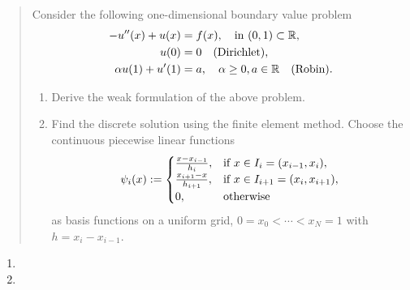 \documentclass[english]{exercise}
\begin{document}
    \begin{quote}
        Consider the following one-dimensional boundary value problem
        \begin{align*}
            -u''\parentheses*{x} + u\parentheses*{x} &= f\parentheses*{x}, \quad \text{in }\parentheses*{0, 1} \subset \R,\\
            u\parentheses*{0} &= 0 \quad \text{(Dirichlet)},\\
            \alpha u\parentheses*{1} + u'\parentheses*{1} &= a, \quad \alpha \ge 0, a \in \R \quad \text{(Robin)}.
        \end{align*}
        \begin{enumerate}
            \item Derive the weak formulation of the above problem.
            \item Find the discrete solution using the finite element method.
            Choose the continuous piecewise linear functions
            \[
                \psi_i\parentheses*{x} := \begin{cases}
                    \frac{x - x_{i - 1}}{h_i}, & \text{if }x \in I_i = \parentheses*{x_{i - 1}, x_i},\\
                    \frac{x_{i + 1} - x}{h_{i + 1}}, & \text{if }x \in I_{i + 1} = \parentheses*{x_i, x_{i + 1}},\\
                    0, & \text{otherwise}
                \end{cases}
            \]
            as basis functions on a uniform grid, \(0 = x_0 < \cdots < x_N = 1\) with \(h = x_i - x_{i - 1}\).
        \end{enumerate}
    \end{quote}
    
    \begin{enumerate}
        \item
        \item
    \end{enumerate}
\end{document}

